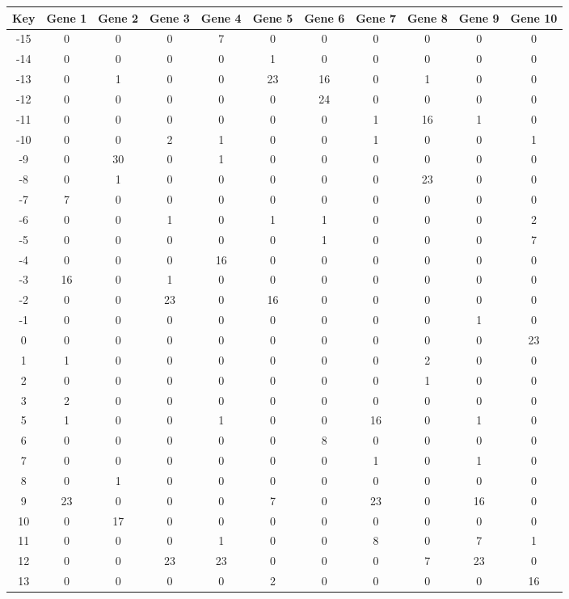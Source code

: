 \begin{tabular}{|c|c|c|c|c|c|c|c|c|c|c|}
\hline
Key & Gene 1 & Gene 2 & Gene 3 & Gene 4 & Gene 5 & Gene 6 & Gene 7 & Gene 8 & Gene 9 & Gene 10 \\
\hline
-15 & 0 & 0 & 0 & 7 & 0 & 0 & 0 & 0 & 0 & 0 \\
-14 & 0 & 0 & 0 & 0 & 1 & 0 & 0 & 0 & 0 & 0 \\
-13 & 0 & 1 & 0 & 0 & 23 & 16 & 0 & 1 & 0 & 0 \\
-12 & 0 & 0 & 0 & 0 & 0 & 24 & 0 & 0 & 0 & 0 \\
-11 & 0 & 0 & 0 & 0 & 0 & 0 & 1 & 16 & 1 & 0 \\
-10 & 0 & 0 & 2 & 1 & 0 & 0 & 1 & 0 & 0 & 1 \\
-9 & 0 & 30 & 0 & 1 & 0 & 0 & 0 & 0 & 0 & 0 \\
-8 & 0 & 1 & 0 & 0 & 0 & 0 & 0 & 23 & 0 & 0 \\
-7 & 7 & 0 & 0 & 0 & 0 & 0 & 0 & 0 & 0 & 0 \\
-6 & 0 & 0 & 1 & 0 & 1 & 1 & 0 & 0 & 0 & 2 \\
-5 & 0 & 0 & 0 & 0 & 0 & 1 & 0 & 0 & 0 & 7 \\
-4 & 0 & 0 & 0 & 16 & 0 & 0 & 0 & 0 & 0 & 0 \\
-3 & 16 & 0 & 1 & 0 & 0 & 0 & 0 & 0 & 0 & 0 \\
-2 & 0 & 0 & 23 & 0 & 16 & 0 & 0 & 0 & 0 & 0 \\
-1 & 0 & 0 & 0 & 0 & 0 & 0 & 0 & 0 & 1 & 0 \\
0 & 0 & 0 & 0 & 0 & 0 & 0 & 0 & 0 & 0 & 23 \\
1 & 1 & 0 & 0 & 0 & 0 & 0 & 0 & 2 & 0 & 0 \\
2 & 0 & 0 & 0 & 0 & 0 & 0 & 0 & 1 & 0 & 0 \\
3 & 2 & 0 & 0 & 0 & 0 & 0 & 0 & 0 & 0 & 0 \\
5 & 1 & 0 & 0 & 1 & 0 & 0 & 16 & 0 & 1 & 0 \\
6 & 0 & 0 & 0 & 0 & 0 & 8 & 0 & 0 & 0 & 0 \\
7 & 0 & 0 & 0 & 0 & 0 & 0 & 1 & 0 & 1 & 0 \\
8 & 0 & 1 & 0 & 0 & 0 & 0 & 0 & 0 & 0 & 0 \\
9 & 23 & 0 & 0 & 0 & 7 & 0 & 23 & 0 & 16 & 0 \\
10 & 0 & 17 & 0 & 0 & 0 & 0 & 0 & 0 & 0 & 0 \\
11 & 0 & 0 & 0 & 1 & 0 & 0 & 8 & 0 & 7 & 1 \\
12 & 0 & 0 & 23 & 23 & 0 & 0 & 0 & 7 & 23 & 0 \\
13 & 0 & 0 & 0 & 0 & 2 & 0 & 0 & 0 & 0 & 16 \\
\hline
\end{tabular}